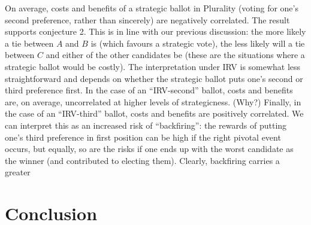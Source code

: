\documentclass[12pt, letter]{article}
\begin{document}
On average, costs and benefits of a strategic ballot in Plurality (voting for one's second preference, rather than sincerely) are negatively correlated. The result supports conjecture 2. This is in line with our previous discussion: the more likely a tie between $A$ and $B$ is (which favours a strategic vote), the less likely will a tie between $C$ and either of the other candidates be (these are the situations where a strategic ballot would be costly). The interpretation under IRV is somewhat less straightforward and depends on whether the strategic ballot puts one's second or third preference first. In the case of an ``IRV-second'' ballot, costs and benefits are, on average, uncorrelated at higher levels of strategicness. (Why?) Finally, in the case of an ``IRV-third'' ballot, costs and benefits are positively correlated. We can interpret this as an increased risk of ``backfiring'': the rewards of putting one's third preference in first position can be high if the right pivotal event occurs, but equally, so are the risks if one ends up with the worst candidate as the winner (and contributed to electing them). Clearly, backfiring carries a greater 

\section{Conclusion}
\end{document}
